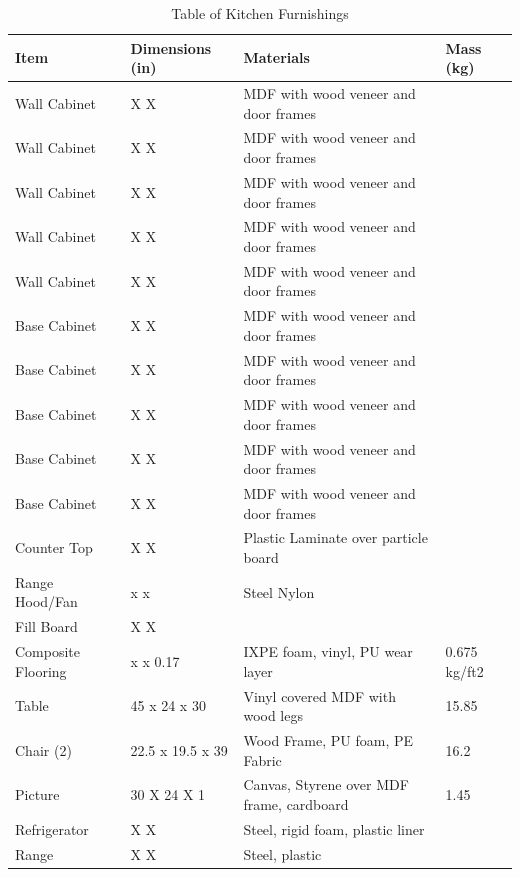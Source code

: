 \documentclass[12pt,oneside]{book}
\begin{document}
\begin{table}[!ht]
	\centering
	\caption{Table of Kitchen Furnishings}
	\label{tab:BRFuel}
	\begin{tabular}{llll}
		\toprule[1.5pt]
		Item 				& Dimensions (in) 	& Materials 										& Mass (kg)  \\
		\midrule
		Wall Cabinet 	  	&  X  X   			& MDF with wood veneer and door frames 				&       \\
		Wall Cabinet   		&  X  X  			& MDF with wood veneer and door frames   			&        \\
		Wall Cabinet   		&  X  X 			& MDF with wood veneer and door frames 				&      \\
		Wall Cabinet      	&  X  X 		 	& MDF with wood veneer and door frames 				&      \\	
		Wall Cabinet 	  	&  X  X   			& MDF with wood veneer and door frames 				&       \\
		Base Cabinet		&  X  X 		 	& MDF with wood veneer and door frames				&     \\	
		Base Cabinet		&  X  X 		 	& MDF with wood veneer and door frames				&     \\
		Base Cabinet		&  X  X 		 	& MDF with wood veneer and door frames				&     \\
		Base Cabinet		&  X  X 		 	& MDF with wood veneer and door frames				&     \\
		Base Cabinet		&  X  X 		 	& MDF with wood veneer and door frames				&     \\
		Counter Top			&    X    X 		& Plastic Laminate over particle board          	&         \\
		Range Hood/Fan		&  x  x 			& Steel Nylon										&   \\
		Fill Board		 	&  X   X   			& 			 										&    \\
		Composite Flooring	&  x  x 0.17		& IXPE foam, vinyl, PU wear layer					&	0.675 kg/ft2  \\
		Table				& 45 x 24 x 30		& Vinyl covered MDF with wood legs					& 	15.85 \\
		Chair (2)			& 22.5 x 19.5 x 39  & Wood Frame, PU foam, PE Fabric 					&  16.2  \\
		Picture 			& 30 X 24 X 1		& Canvas, Styrene over MDF frame, cardboard 		&  1.45  \\
		Refrigerator		&  X  X             & Steel, rigid foam, plastic liner					&        \\
		Range 				&  X   X 			& Steel, plastic 									&        \\
		\bottomrule[1.25pt]
	\end{tabular}
\end{table}
\end{document}
